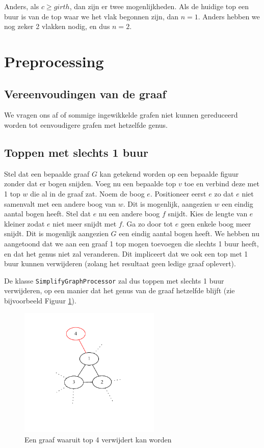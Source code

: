 \documentclass{article}
\begin{document}
Anders, als $c \geq girth$, dan zijn er twee mogenlijkheden. Als de huidige top
een buur is van de top waar we het vlak begonnen zijn, dan $n = 1$. Anders
hebben we nog zeker 2 vlakken nodig, en dus $n = 2$.

\section{Preprocessing}

\subsection{Vereenvoudingen van de graaf}
We vragen ons af of sommige ingewikkelde grafen niet kunnen gereduceerd worden
tot eenvoudigere grafen met hetzelfde genus.

\subsection{Toppen met slechts 1 buur}
\label{one-neighbour}
Stel dat een bepaalde graaf $G$ kan getekend worden op een bepaalde figuur
zonder dat er bogen snijden. Voeg nu een bepaalde top $v$ toe en verbind deze
met 1 top $w$ die al in de graaf zat. Noem de boog $e$. Positioneer eerst $e$
zo dat $e$ niet samenvalt met een andere boog van $w$. Dit is mogenlijk,
aangezien $w$ een eindig aantal bogen heeft. Stel dat $e$ nu een andere boog
$f$ snijdt. Kies de lengte van $e$ kleiner zodat $e$ niet meer snijdt met $f$.
Ga zo door tot $e$ geen enkele boog meer snijdt. Dit is mogenlijk aangezien
$G$ een eindig aantal bogen heeft. We hebben nu aangetoond dat we aan een graaf
1 top mogen toevoegen die slechts 1 buur heeft, en dat het genus niet zal
veranderen. Dit impliceert dat we ook een top met 1 buur kunnen verwijderen
(zolang het resultaat geen ledige graaf oplevert).
\newline

De klasse \verb#SimplifyGraphProcessor# zal dus toppen met slechts 1 buur
verwijderen, op een manier dat het genus van de graaf hetzelfde blijft (zie
bijvoorbeeld Figuur \ref{fig:one-neighbour}).

\begin{figure}
\begin{center}
\includegraphics[width=0.6\textwidth]{images/one-neighbour.pdf}
\caption{Een graaf waaruit top 4 verwijdert kan worden}
\label{fig:one-neighbour}
\end{center}
\end{figure}
\end{document}
